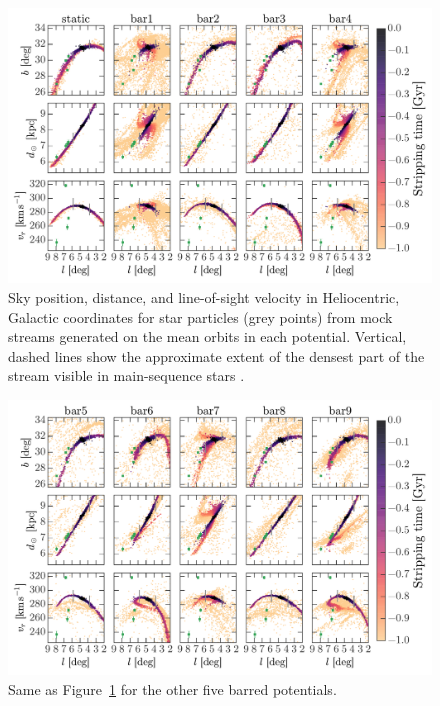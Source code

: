 \documentclass[letterpaper,12pt,preprint]{aastex}
\begin{document}
\clearpage
\begin{figure}[p]
\begin{center}
\includegraphics[width=\textwidth]{figures/mockstream0}
\caption{ Sky position, distance, and line-of-sight velocity in Heliocentric, Galactic coordinates for star particles (grey points) from mock streams generated on the mean orbits in each potential. Vertical, dashed lines show the approximate extent of the densest part of the stream visible in main-sequence stars \citep[the segment originally detected in ][]{bernard14}.}
\label{fig:mockstream0}
\end{center}
\end{figure}

\clearpage
\begin{figure}[p]
\begin{center}
\includegraphics[width=\textwidth]{figures/mockstream1}
\caption{ Same as Figure~\ref{fig:mockstream0} for the other five barred potentials. }
\label{fig:mockstream1}
\end{center}
\end{figure}
\end{document}
